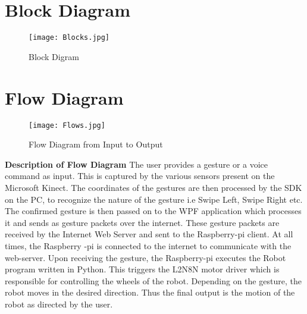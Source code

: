 \section{Block Diagram}

\begin{figure}[H]
  \centering
  \texttt{[image: Blocks.jpg]}
  \caption{Block Digram}
  \label{block}	
\end{figure}


\section{Flow Diagram}



\begin{figure}[H]
  \centering
  \texttt{[image: Flows.jpg]}
  \caption{Flow Diagram from Input to Output}
  \label{Flow}	
\end{figure}
\textbf{Description of Flow Diagram}
\newline
The user provides a gesture or a voice command as input. This is captured by the various sensors present on the Microsoft Kinect. The coordinates of the gestures are then processed by the SDK on the PC, to recognize the nature of the gesture i.e Swipe Left, Swipe Right etc. The confirmed gesture is then passed on to the WPF application which processes it and sends as gesture packets over the internet. These gesture packets are received by the Internet Web Server and sent to the Raspberry-pi client. At all times, the Raspberry -pi is connected to the internet to communicate with the web-server. Upon receiving the gesture, the Raspberry-pi executes the Robot program written in Python. This triggers the L2N8N motor driver which is responsible for controlling the wheels of the robot. Depending on the gesture, the robot moves in the desired direction. Thus the final output is the motion of the robot as directed by the user.






